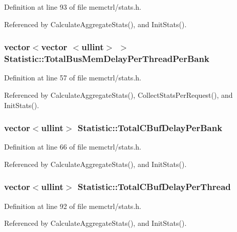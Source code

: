 Definition at line 93 of file memctrl/stats.h.

Referenced by CalculateAggregateStats(), and InitStats().
\subsubsection[{TotalBusMemDelayPerThreadPerBank}]{\setlength{\rightskip}{0pt plus 5cm}vector$<$vector $<${\bf ullint}$>$ $>$ {\bf Statistic::TotalBusMemDelayPerThreadPerBank}}\label{classStatistic_bf56310450a4f8d60cdb309c67d8333a}




Definition at line 57 of file memctrl/stats.h.

Referenced by CalculateAggregateStats(), CollectStatsPerRequest(), and InitStats().
\subsubsection[{TotalCBufDelayPerBank}]{\setlength{\rightskip}{0pt plus 5cm}vector$<${\bf ullint}$>$ {\bf Statistic::TotalCBufDelayPerBank}}\label{classStatistic_47c706612634fcf0d982d3c7ab20233c}




Definition at line 66 of file memctrl/stats.h.

Referenced by CalculateAggregateStats(), and InitStats().
\subsubsection[{TotalCBufDelayPerThread}]{\setlength{\rightskip}{0pt plus 5cm}vector$<${\bf ullint}$>$ {\bf Statistic::TotalCBufDelayPerThread}}\label{classStatistic_eed5f6b23662227cf58f06d69cd2eb9b}




Definition at line 92 of file memctrl/stats.h.

Referenced by CalculateAggregateStats(), and InitStats().
